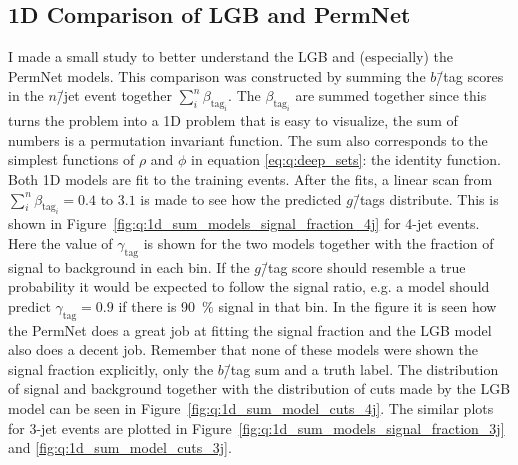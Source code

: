 \subsection{1D Comparison of LGB and PermNet}
\label{subsec:q:lgb_permnet_comparison}

I made a small study to better understand the LGB and (especially) the PermNet models. This comparison was constructed by summing the $b$\=/tag scores in the $n$\=/jet event together $\sum_i^n \beta_{\mathrm{tag}_i}$. The $\beta_{\mathrm{tag}_i}$ are summed together since this turns the problem into a \num{1}D problem that is easy to visualize, the sum of numbers is a permutation invariant function. The sum also corresponds to the simplest functions of $\rho$ and $\phi$ in equation \eqref{eq:q:deep_sets}: the identity function. Both 1D models are fit to the training events. After the fits, a linear scan from $\sum_i^n \beta_{\mathrm{tag}_i}=0.4$ to $3.1$ is made to see how the predicted $g$\=/tags distribute. This is shown in Figure~\ref{fig:q:1d_sum_models_signal_fraction_4j} for 4-jet events. Here the value of $\gamma_\mathrm{tag}$ is shown for the two models together with the fraction of signal to background in each bin. If the $g$\=/tag score should resemble a true probability it would be expected to follow the signal ratio, e.g. a model should predict $\gamma_\mathrm{tag}=0.9$ if there is \SI{90}{\percent} signal in that bin. In the figure it is seen how the PermNet does a great job at fitting the signal fraction and the LGB model also does a decent job. Remember that none of these models were shown the signal fraction explicitly, only the $b$\=/tag sum and a truth label. The distribution of signal and background together with the distribution of cuts made by the LGB model can be seen in Figure~\ref{fig:q:1d_sum_model_cuts_4j}. The similar plots for 3-jet events are plotted in Figure~\ref{fig:q:1d_sum_models_signal_fraction_3j} and \ref{fig:q:1d_sum_model_cuts_3j}.

